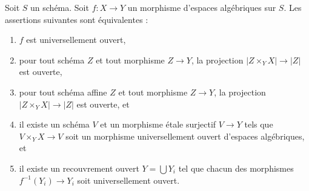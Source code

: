 \begin{lemma}
\label{lemma-universally-open-local}
Soit $S$ un schéma. Soit $f : X \to Y$ un morphisme d'espaces algébriques
sur $S$. Les assertions suivantes sont équivalentes :
\begin{enumerate}
\item $f$ est universellement ouvert,
\item pour tout schéma $Z$ et tout morphisme $Z \to Y$,
la projection $|Z \times_Y X| \to |Z|$ est ouverte,
\item pour tout schéma affine $Z$ et tout morphisme $Z \to Y$,
la projection $|Z \times_Y X| \to |Z|$ est ouverte, et
\item il existe un schéma $V$ et un morphisme \'etale surjectif
$V \to Y$ tels que $V \times_Y X \to V$ soit un morphisme universellement ouvert
d'espaces algébriques, et
\item il existe un recouvrement ouvert $Y = \bigcup Y_i$ tel que
chacun des morphismes $f^{-1}(Y_i) \to Y_i$ soit universellement ouvert.
\end{enumerate}
\end{lemma}

